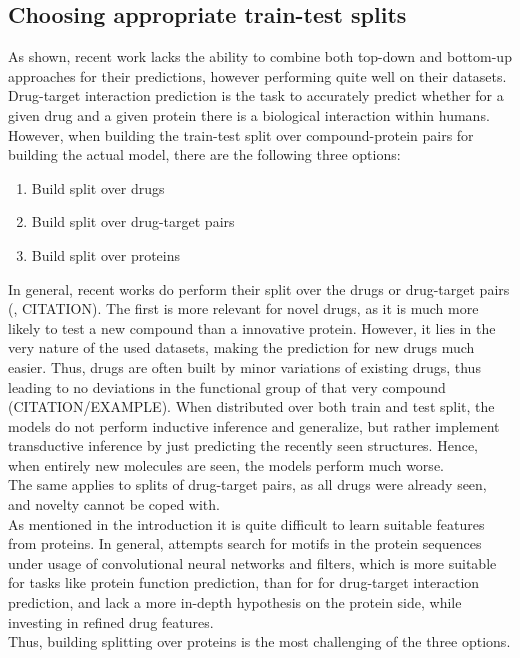 \documentclass{bioinfo}
\begin{document}
\subsection{Choosing appropriate train-test splits}
As shown, recent work lacks the ability to combine both top-down and bottom-up approaches for their predictions, however performing quite well on their datasets. Drug-target interaction prediction is the task to accurately predict whether for a given drug and a given protein there is a biological interaction within humans. However, when building the train-test split over compound-protein pairs for building the actual model, there are the following three options:
\begin{enumerate}
	\item Build split over drugs
	\item Build split over drug-target pairs
	\item Build split over proteins
\end{enumerate} 
In general, recent works do perform their split over the drugs or drug-target pairs (\cite{Survey2018}, CITATION). The first is more relevant for novel drugs, as it is much more likely to test a new compound than a innovative protein. However, it lies in the very nature of the used datasets, making the prediction for new drugs much easier. Thus, drugs are often built by minor variations of existing drugs, thus leading to no deviations in the functional group of that very compound (CITATION/EXAMPLE). When distributed over both train and test split, the models do not perform inductive inference and generalize, but rather implement transductive inference by just predicting the recently seen structures. Hence, when entirely new molecules are seen, the models perform much worse. \\
The same applies to splits of drug-target pairs, as all drugs were already seen, and novelty cannot be coped with.\\
As mentioned in the introduction it is quite difficult to learn suitable features from proteins. In general, attempts search for motifs in the protein sequences under usage of convolutional neural networks and filters, which is more suitable for tasks like protein function prediction, than for for drug-target interaction prediction, and lack a more in-depth hypothesis on the protein side, while investing in refined drug features. \\
Thus, building splitting over proteins is the most challenging of the three options. \\
\end{document}
